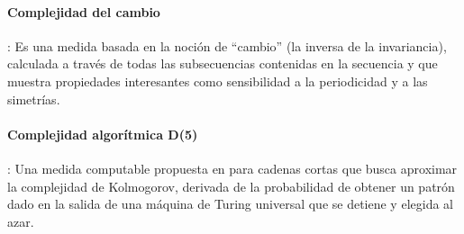 \paragraph{Complejidad del cambio}\cite{f47}: Es una medida basada en la noción de ``cambio'' (la inversa de la invariancia), calculada 
a través de todas las subsecuencias contenidas en la secuencia y que muestra propiedades interesantes como sensibilidad a la periodicidad y a las simetrías.


\paragraph{Complejidad algorítmica D(5)}: Una medida computable propuesta en \cite{f44,f45,f46} para cadenas cortas que busca aproximar la complejidad de Kolmogorov, derivada de la probabilidad de obtener un patrón dado en la salida de una máquina de Turing universal que se detiene y elegida al azar.

